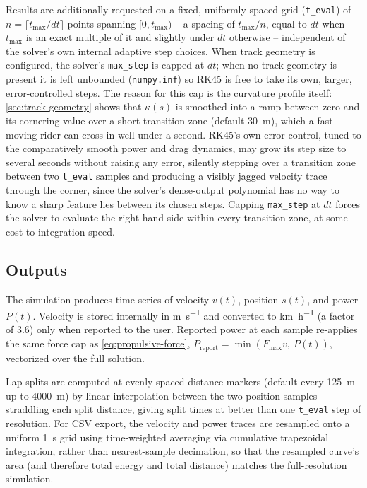 Results are additionally requested on a fixed, uniformly spaced grid
(\nolinkurl{t_eval}) of $n = \lceil t_{\max}/dt \rceil$ points spanning
$[0, t_{\max})$ -- a spacing of $t_{\max}/n$, equal to $dt$ when $t_{\max}$ is an
exact multiple of it and slightly under $dt$ otherwise -- independent of the
solver's own internal adaptive step choices. When track geometry is configured, the solver's
\nolinkurl{max_step} is capped at $dt$; when no track geometry is present it is left
unbounded (\nolinkurl{numpy.inf}) so RK45 is free to take its own, larger,
error-controlled steps. The reason for this cap is the curvature profile itself:
\cref{sec:track-geometry} shows that $\kappa(s)$ is smoothed into a ramp between
zero and its cornering value over a short transition zone (default
\SI{30}{\metre}), which a fast-moving rider can cross in well under a second.
RK45's own error control, tuned to the comparatively smooth power and drag
dynamics, may grow its step size to several seconds without raising any error,
silently stepping over a transition zone between two \nolinkurl{t_eval} samples
and producing a visibly jagged velocity trace through the corner, since the
solver's dense-output polynomial has no way to know a sharp feature lies between
its chosen steps. Capping \nolinkurl{max_step} at $dt$ forces the solver to
evaluate the right-hand side within every transition zone, at some cost to
integration speed.

\subsection{Outputs}
\label{sec:sim-outputs}

The simulation produces time series of velocity $v(t)$, position $s(t)$, and
power $P(t)$. Velocity is stored internally in \si{\metre\per\second} and
converted to \si{\kilo\metre\per\hour} (a factor of $3.6$) only when reported to
the user. Reported power at each sample re-applies the same force cap as
\cref{eq:propulsive-force}, $P_{\mathrm{report}} = \min(F_{\max} v,\ P(t))$,
vectorized over the full solution.

Lap splits are computed at evenly spaced distance markers (default every
\SI{125}{\metre} up to \SI{4000}{\metre}) by linear interpolation between the two
position samples straddling each split distance, giving split times at better
than one \nolinkurl{t_eval} step of resolution. For CSV export, the velocity and
power traces are resampled onto a uniform \SI{1}{\second} grid using
time-weighted averaging via cumulative trapezoidal integration, rather than
nearest-sample decimation, so that the resampled curve's area (and therefore
total energy and total distance) matches the full-resolution simulation.
